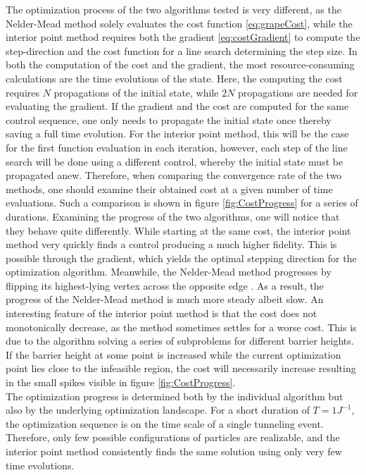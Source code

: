 The optimization process of the two algorithms tested is very different, as the Nelder-Mead method solely evaluates the cost function \eqref{eq:grapeCost}, while the interior point method requires both the gradient \eqref{eq:costGradient} to compute the step-direction and the cost function for a line search determining the step size. In both the computation of the cost and the gradient, the most resource-consuming calculations are the time evolutions of the state. Here, the computing the cost requires $N$ propagations of the initial state, while $2 N$ propagations are needed for evaluating the gradient. If the gradient and the cost are computed for the same control sequence, one only needs to propagate the initial state once thereby saving a full time evolution. For the interior point method, this will be the case for the first function evaluation in each iteration, however, each step of the line search will be done using a different control, whereby the initial state must be propagated anew.
Therefore, when comparing the convergence rate of the two methods, one should examine their obtained cost at a given number of time evaluations. Such a comparison is shown in figure \ref{fig:CostProgress} for a series of durations. Examining the progress of the two algorithms, one will notice that they behave quite differently. While starting at the same cost, the interior point method very quickly finds a control producing a much higher fidelity. This is possible through the gradient, which yields the optimal stepping direction for the optimization algorithm. Meanwhile, the Nelder-Mead method progresses by flipping its highest-lying vertex across the opposite edge \cite{wright}. As a result, the progress of the Nelder-Mead method is much more steady albeit slow.
An interesting feature of the interior point method is that the cost does not monotonically decrease, as the method sometimes settles for a worse cost. This is due to the algorithm solving a series of subproblems for different barrier heights. If the barrier height at some point is increased while the current optimization point lies close to the infeasible region, the cost will necessarily increase resulting in the small spikes visible in figure \ref{fig:CostProgress}.\\

The optimization progress is determined both by the individual algorithm but also by the underlying optimization landscape. For a short duration of $T=1 J^{-1}$, the optimization sequence is on the time scale of a single tunneling event. Therefore, only few possible configurations of particles are realizable, and the interior point method consistently finds the same solution using only very few time evolutions.


